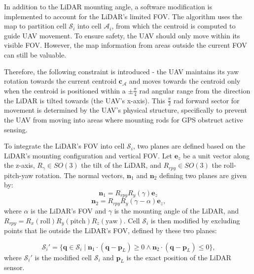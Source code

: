             In addition to the \ac{LiDAR} mounting angle, a software modification is implemented to account for the \ac{LiDAR}'s limited \ac{FOV}.
            The algorithm uses the map to partition cell $\mathcal{S}_i$ into cell $\mathcal{A}_i$, from which the centroid is computed to guide \ac{UAV} movement.
            To ensure safety, the \ac{UAV} should only move within its visible \ac{FOV}. 
            However, the map information from areas outside the current \ac{FOV} can still be valuable. 

            Therefore, the following constraint is introduced - the \ac{UAV} maintains its yaw rotation towards the current centroid $\mathbf{c}_{\mathcal{A}}$ and moves towards the centroid only when the centroid is positioned within a $\pm \frac{\pi}{4}$ rad angular range from the direction the \ac{LiDAR} is tilted towards (the \ac{UAV}'s x-axis).
            This $\frac{\pi}{2}$ rad forward sector for movement is determined by the \ac{UAV}'s physical structure, specifically to prevent the \ac{UAV} from moving into areas where mounting rods for \ac{GPS} obstruct active sensing.

            To integrate the \ac{LiDAR}'s \ac{FOV} into cell $\mathcal{S}_i$, two planes are defined based on the \ac{LiDAR}'s mounting configuration and vertical \ac{FOV}.
            Let $\mathbf{e}_z$ be a unit vector along the z-axis, $R_{\gamma} \in SO(3)$ the tilt of the \ac{LiDAR}, and $R_{rpy} \in SO(3)$ the roll-pitch-yaw rotation.
            The normal vectors, $\mathbf{n}_1$ and $\mathbf{n}_2$ defining two planes are given by:
            \begin{equation}
                \mathbf{n}_1 = R_{rpy} R_{y}(\gamma)  \mathbf{e}_z    
            \end{equation}
            \begin{equation}
                \mathbf{n}_2 = R_{rpy} R_{y}(\gamma - \alpha) \mathbf{e}_z  \text{,}
            \end{equation}
            where $\alpha$ is the \ac{LiDAR}'s \ac{FOV} and $\gamma$ is the mounting angle of the \ac{LiDAR}, and $R_{rpy} = R_x(\text{roll})R_y(\text{pitch})R_z(\text{yaw})$.
            Cell $\mathcal{S}_i$ is then modified by excluding points that lie outside the \ac{LiDAR}'s \ac{FOV}, defined by these two planes: 

            \begin{equation}
                \mathcal{S}_i' = \{ \mathbf{q} \in \mathcal{S}_i \mid \mathbf{n}_1 \cdot (\mathbf{q} - \mathbf{p}_{L}) \geq 0 \land \mathbf{n}_2 \cdot (\mathbf{q} - \mathbf{p}_{L}) \leq 0 \}\text{,}
            \end{equation}
            where $\mathcal{S}_i'$ is the modified cell $\mathcal{S}_i$ and $\mathbf{p}_{L}$ is the exact position of the LiDAR sensor.

